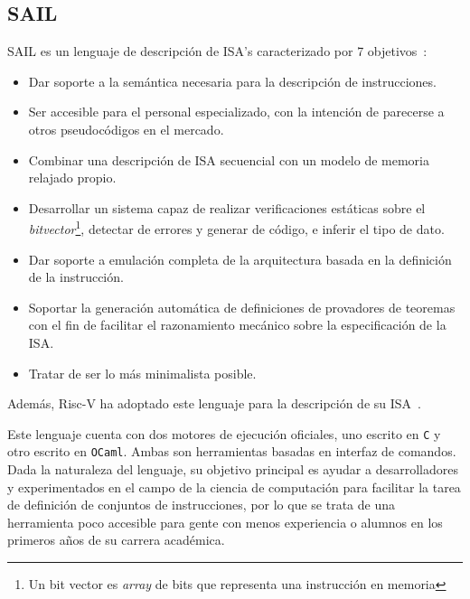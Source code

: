 \subsection{SAIL}

SAIL es un lenguaje de descripción de ISA's caracterizado por 7 objetivos~\cite{sail}: 
\begin{itemize}
    \item Dar soporte a la semántica necesaria para la descripción de instrucciones.
    \item Ser accesible para el personal especializado, con la intención de
    parecerse a otros pseudocódigos en el mercado.
    \item Combinar una descripción de ISA secuencial con un modelo de memoria relajado propio.
    \item Desarrollar un sistema capaz de realizar verificaciones estáticas
    sobre el \textit{bitvector}\footnote{Un bit vector es \textit{array} de
    bits que representa una instrucción en memoria}, detectar de errores y
    generar de código, e inferir el tipo de dato.
    \item Dar soporte a emulación completa de la arquitectura basada en la definición de la instrucción.
    \item Soportar la generación automática de definiciones de provadores de
    teoremas con el fin de facilitar el razonamiento mecánico sobre la
    especificación de la ISA\@.
    \item Tratar de ser lo más minimalista posible.
\end{itemize}

Además, Risc-V ha adoptado este lenguaje para la descripción de su
ISA~\cite{sail-riscv}.

Este lenguaje cuenta con dos motores de ejecución oficiales, uno escrito en
\texttt{C} y otro escrito en \texttt{OCaml}. Ambas son herramientas basadas en
interfaz de comandos. Dada la naturaleza del lenguaje, su objetivo principal es
ayudar a desarrolladores y experimentados en el campo de la ciencia de
computación para facilitar la tarea de definición de conjuntos de
instrucciones, por lo que se trata de una herramienta poco accesible para gente
con menos experiencia o alumnos en los primeros años de su carrera académica.

